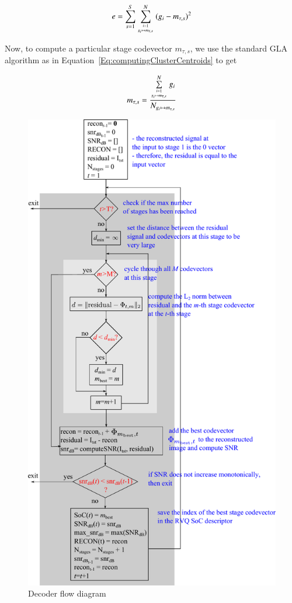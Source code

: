 \begin{Body}
\begin{equation}
e = \sum_{s=1}^S\sum\limits_{{i=1 \atop g_i \mapsto m_{\tau, s}}}^N{(g_i - m_{\tau, s})}^2
\end{equation} 

Now, to compute a particular stage codevector $m_{\tau, s}$, we use the standard GLA algorithm as in Equation~\ref{Eq:computingClusterCentroids} to get

\begin{equation}
m_{\tau, s} = \frac{\sum\limits_{{i=1 \atop g_i \mapsto m_{\tau, s}}}^N g_i}{N_{g_i \mapsto m_{\tau, s}}}
\label{Eq:finalCAC}
\end{equation}

\begin{figure}[ht]
\centering
\includegraphics[height=0.6\textheight]{thesis/RVQ_explorer_flowDiagram.pdf}
\caption{Decoder flow diagram}
\label{fig:RVQ_decoderFlowDiagram}
\end{figure}



\end{Body}
